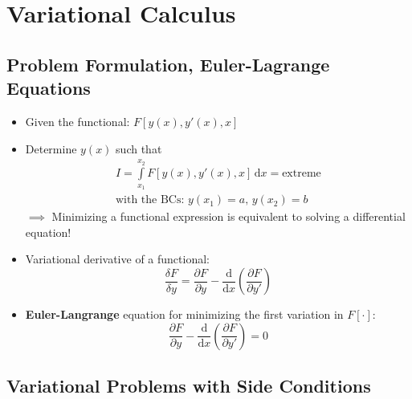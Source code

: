 \section{Variational Calculus}
\subsection{Problem Formulation, Euler-Lagrange Equations}
\begin{itemize}
  \item Given the functional: $F[y(x), y'(x), x]$
  \item Determine $y(x)$ such that
        \begin{align*}
          I = \int\limits_{x_{1}}^{x_{2}} F[y(x), y'(x), x] \, \mathrm{d}x = \text{extreme}\\
          \text{with the BCs: } y(x_{1}) = a,\, y(x_{2}) = b
        \end{align*}
  $\implies$ Minimizing a functional expression is equivalent to solving a differential equation!
  \item Variational derivative of a functional:
        \begin{equation*}
          \dfrac{\delta F}{\delta y} = \dfrac{\partial F}{\partial y} - \dfrac{\mathrm{d}}{\mathrm{d}x} \left(\dfrac{\partial F}{\partial y'}\right)
        \end{equation*}
  \item \textbf{Euler-Langrange} equation for minimizing the first variation in $F[\cdot]$:
        \begin{equation*}
          \dfrac{\partial F}{\partial y} - \dfrac{\mathrm{d}}{\mathrm{d}x} \left(\dfrac{\partial F}{\partial y'}\right) = 0
        \end{equation*}
\end{itemize}

\subsection{Variational Problems with Side Conditions}

